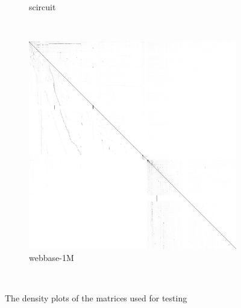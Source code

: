 \begin{figure}
\begin{multicols}{3}
\begin{subfigure}{\linewidth}
\caption{scircuit}
\end{subfigure}~%
\begin{subfigure}{\linewidth}
\includegraphics[width=\linewidth]{images/webbase-1M}
\caption{webbase-1M}
\end{subfigure}~%
\end{multicols}
\caption{The density plots of the matrices used for testing}
\end{figure}
